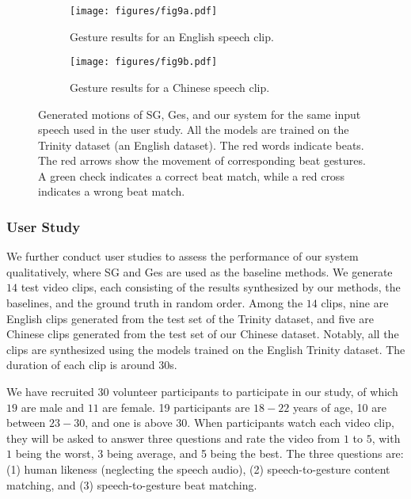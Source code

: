\documentclass[acmtog,authorversion]{acmart}
\begin{document}
\begin{figure*}[t]
    \centering
    \begin{subfigure}[t]{0.48\textwidth}
        \centering
        \texttt{[image: figures/fig9a.pdf]}
        \caption{Gesture results for an English speech clip.}
        \label{fig:fig9a}
    \end{subfigure}
    \hspace{\fill}
    \begin{subfigure}[t]{0.48\textwidth}
        \centering
        \texttt{[image: figures/fig9b.pdf]}
        \caption{Gesture results for a Chinese speech clip.}
        \label{fig:fig9b}
    \end{subfigure}
    \caption{Generated motions of SG, Ges, and our system for the same input speech used in the user study. All the models are trained on the Trinity dataset (an English dataset). The red words indicate beats. The red arrows show the movement of corresponding beat gestures. A green check indicates a correct beat match, while a red cross indicates a wrong beat match.}
    \label{fig:fig9}
    \Description{}
\end{figure*}

\subsubsection{User Study}
\label{subsubsec:user_study}
We further conduct user studies to assess the performance of our system qualitatively, where SG \cite{alexanderson2020style} and Ges \cite{kucherenko2020gesticulator} are used as the baseline methods. 
We generate $14$ test video clips, each consisting of the results synthesized by our methods, the baselines, and the ground truth in random order. Among the $14$ clips, nine are English clips generated from the test set of the Trinity dataset, and five are Chinese clips generated from the test set of our Chinese dataset. Notably, all the clips are synthesized using the models trained on the English Trinity dataset. The duration of each clip is around $30$s. 

We have recruited $30$ volunteer participants to participate in our study, of which $19$ are male and $11$ are female. 19 participants are $18-22$ years of age, 10 are between $23-30$, and one is above $30$. When participants watch each video clip, they will be asked to answer three questions and rate the video from $1$ to $5$, with $1$ being the worst, $3$ being average, and 5 being the best. The three questions are: (1) human likeness (neglecting the speech audio), (2) speech-to-gesture content matching, and (3) speech-to-gesture beat matching. 
\end{document}
